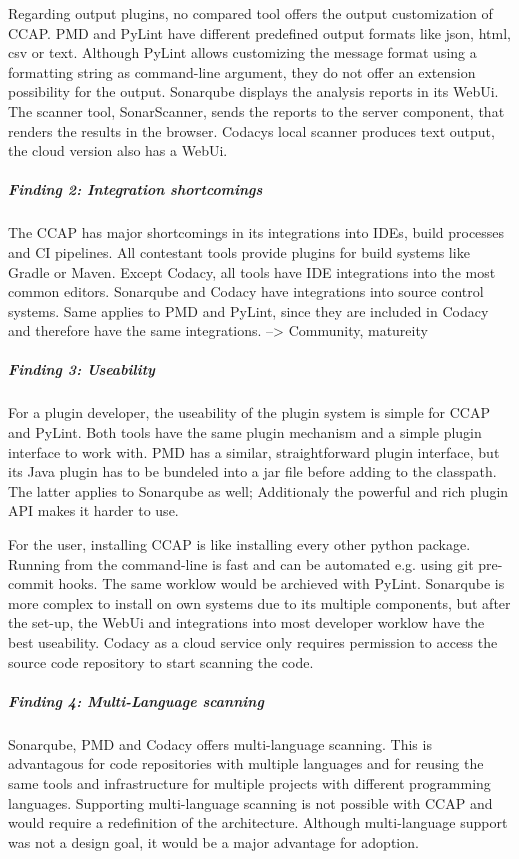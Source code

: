 Regarding output plugins, no compared tool offers the output customization of CCAP. PMD and PyLint have different predefined output formats like json, html, csv or text. Although PyLint allows customizing the message format using a formatting string as command-line argument, they do not offer an extension possibility for the output. Sonarqube displays the analysis reports in its WebUi. The scanner tool, SonarScanner, sends the reports to the server component, that renders the results in the browser.  Codacys local scanner produces text output, the cloud version also has a WebUi.

\subparagraph{Finding 2: Integration shortcomings}
The CCAP has major shortcomings in its integrations into IDEs, build processes and CI pipelines. All contestant tools provide plugins for build systems like Gradle or Maven. Except Codacy, all tools have IDE integrations into the most common editors. Sonarqube and Codacy have integrations into source control systems. Same applies to PMD and PyLint, since they are included in Codacy and therefore have the same integrations. --> Community, matureity

\subparagraph{Finding 3: Useability}
For a plugin developer, the useability of the plugin system is simple for CCAP and PyLint. Both tools have the same plugin mechanism and a simple plugin interface to work with. PMD has a similar, straightforward plugin interface, but its Java plugin has to be bundeled into a jar file before adding to the classpath. The latter applies to Sonarqube as well; Additionaly the powerful and rich plugin API makes it harder to use.

For the user, installing CCAP is like installing every other python package. Running from the command-line is fast and can be automated e.g. using git pre-commit hooks. The same worklow would be archieved with PyLint. Sonarqube is more complex to install on own systems due to its multiple components, but after the set-up, the WebUi and integrations into most developer worklow have the best useability. Codacy as a cloud service only requires permission to access the source code repository to start scanning the code.

\subparagraph{Finding 4: Multi-Language scanning}
Sonarqube, PMD and Codacy offers multi-language scanning. This is advantagous for code repositories with multiple languages and for reusing the same tools and infrastructure for multiple projects with different programming languages. Supporting multi-language scanning is not possible with CCAP and would require a redefinition of the architecture. Although multi-language support was not a design goal, it would be a major advantage for adoption.

